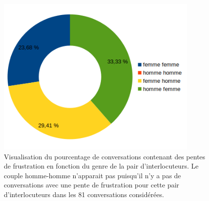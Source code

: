 \begin{figure}[h]
  \centering
  \includegraphics[width=10cm]{./Chapitre7/figures/genre.png}
  \caption{Visualisation du pourcentage de conversations contenant des pentes de frustration en fonction du genre de la pair d'interlocuteurs. Le couple homme-homme n'apparait pas puisqu'il n'y a pas de conversations avec une pente de frustration pour cette pair d'interlocuteurs dans les 81 conversations considérées.}
  \label{fig:genre}
\end{figure}
